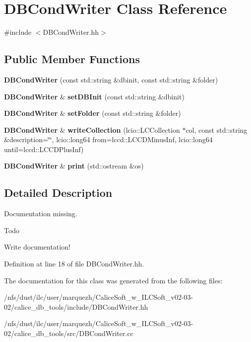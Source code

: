 \section{D\-B\-Cond\-Writer Class Reference}
\label{classDBCondWriter}


{\ttfamily \#include $<$D\-B\-Cond\-Writer.\-hh$>$}

\subsection*{Public Member Functions}
\begin{DoxyCompactItemize}
\item 
{\bfseries D\-B\-Cond\-Writer} (const std\-::string \&dbinit, const std\-::string \&folder)\label{classDBCondWriter_a76f2042ad06b03a0bee5e220dfd2846f}

\item 
{\bf D\-B\-Cond\-Writer} \& {\bfseries set\-D\-B\-Init} (const std\-::string \&dbinit)\label{classDBCondWriter_ac3469e4c1261e7cfe33760618b8eaeed}

\item 
{\bf D\-B\-Cond\-Writer} \& {\bfseries set\-Folder} (const std\-::string \&folder)\label{classDBCondWriter_ae745139e3b6e663b4df633eaf5317c62}

\item 
{\bf D\-B\-Cond\-Writer} \& {\bfseries write\-Collection} (lcio\-::\-L\-C\-Collection $\ast$col, const std\-::string \&description=\char`\"{}\char`\"{}, lcio\-::long64 from=lccd\-::\-L\-C\-C\-D\-Minus\-Inf, lcio\-::long64 until=lccd\-::\-L\-C\-C\-D\-Plus\-Inf)\label{classDBCondWriter_a41111ddfc3d9bfccf8b69db85a17c720}

\item 
{\bf D\-B\-Cond\-Writer} \& {\bfseries print} (std\-::ostream \&os)\label{classDBCondWriter_aea852127ab2495326077be3a5d963f11}

\end{DoxyCompactItemize}


\subsection{Detailed Description}
Documentation missing. \begin{DoxyRefDesc}{Todo}
\item[{\bf Todo}]Write documentation!\end{DoxyRefDesc}


Definition at line 18 of file D\-B\-Cond\-Writer.\-hh.



The documentation for this class was generated from the following files\-:\begin{DoxyCompactItemize}
\item 
/nfs/dust/ilc/user/marquezh/\-Calice\-Soft\-\_\-w\-\_\-\-I\-L\-C\-Soft\-\_\-v02-\/03-\/02/calice\-\_\-db\-\_\-tools/include/D\-B\-Cond\-Writer.\-hh\item 
/nfs/dust/ilc/user/marquezh/\-Calice\-Soft\-\_\-w\-\_\-\-I\-L\-C\-Soft\-\_\-v02-\/03-\/02/calice\-\_\-db\-\_\-tools/src/D\-B\-Cond\-Writer.\-cc\end{DoxyCompactItemize}
